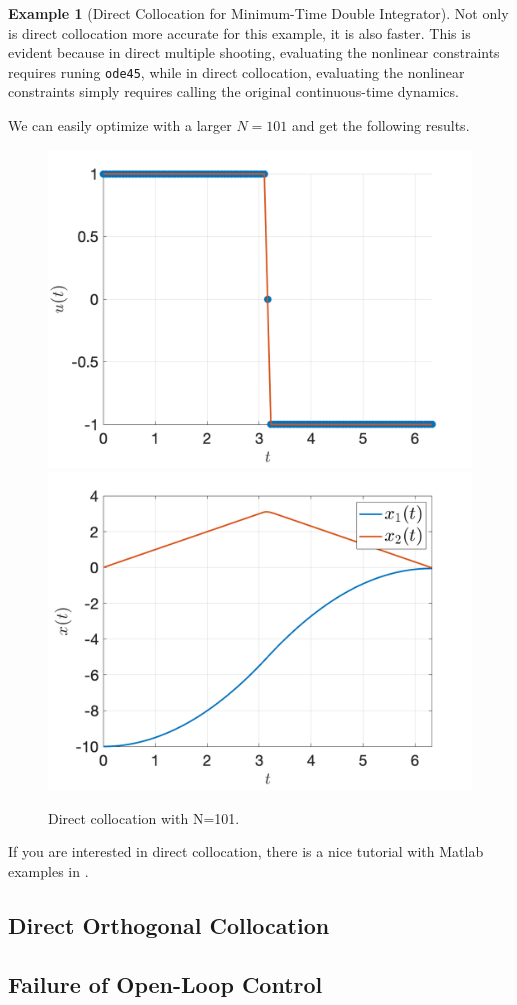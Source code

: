 \documentclass[
]{book}
\theoremstyle{definition}
\theoremstyle{definition}
\newtheorem{example}{Example}[chapter]
\theoremstyle{definition}
\theoremstyle{definition}
\theoremstyle{remark}
\begin{document}
\begin{example}[Direct Collocation for Minimum-Time Double Integrator]
Not only is direct collocation more accurate for this example, it is also faster. This is evident because in direct multiple shooting, evaluating the nonlinear constraints requires runing \texttt{ode45}, while in direct collocation, evaluating the nonlinear constraints simply requires calling the original continuous-time dynamics.

We can easily optimize with a larger \(N=101\) and get the following results.

\begin{figure}

{\centering \includegraphics[width=0.45\linewidth]{images/min_time_di_u_collocation_N_100} \includegraphics[width=0.45\linewidth]{images/min_time_di_x_collocation_N_100} 

}

\caption{Direct collocation with N=101.}\label{fig:min-time-di-u-x-collocation-N-100}
\end{figure}

\end{example}

If you are interested in direct collocation, there is a nice tutorial with Matlab examples in \citep{kelly17siam-trajopt}.

\hypertarget{direct-orthogonal-collocation}{%
\subsection{Direct Orthogonal Collocation}\label{direct-orthogonal-collocation}}

\hypertarget{failure-of-open-loop-control}{%
\subsection{Failure of Open-Loop Control}\label{failure-of-open-loop-control}}
\end{document}
